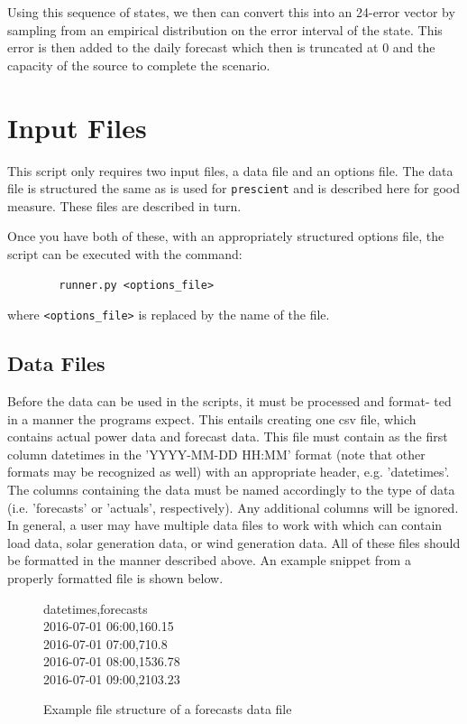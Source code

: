 \documentclass[11pt]{article}
\begin{document}
	Using this sequence of states, we then can convert this into an 24-error 
	vector by sampling from an empirical distribution on the error interval of
	the state. This error is then added to the daily forecast which then is
	truncated at 0 and the capacity of the source to complete the scenario.
	
	\section{Input Files}
	This script only requires two input files, a data file and an options file.
	The data file is structured the same as is used for \texttt{prescient} and
	is described here for good measure.
	These files are described in turn.
	
	Once you have both of these, with an appropriately structured options file,
	the script can be executed with the command:
	\begin{verbatim}
		runner.py <options_file>
	\end{verbatim}
	where \texttt{<options\_file>} is replaced by the name of the file.
	
	\subsection{Data Files}
	Before the data can be used in the scripts, it must be processed and format-
	ted in a manner the programs expect.
	 This entails creating one
	csv file, which contains actual power data and forecast
	data. This
	file must contain as the first column datetimes in the ’YYYY-MM-DD
	HH:MM’ format (note that other formats may be recognized as well) with
	an appropriate header, e.g. ’datetimes’. The columns containing the data
	must be named accordingly to the type of data (i.e. ’forecasts’ or ’actuals’,
	respectively). Any additional columns will be ignored.
	In general, a user may have multiple data files to work with which can
	contain load data, solar generation data, or wind generation data. All of
	these files should be formatted in the manner described above. An example
	snippet from a properly formatted file is shown below.
	
	\begin{figure}[H]
		\begin{framed}
			\noindent
			datetimes,forecasts\\
			2016-07-01 06:00,160.15\\
			2016-07-01 07:00,710.8\\
			2016-07-01 08:00,1536.78\\
			2016-07-01 09:00,2103.23
		\end{framed}
		\caption{Example file structure of a forecasts data file}
		\label{fig:structure_data}
	\end{figure}
	
\end{document}

